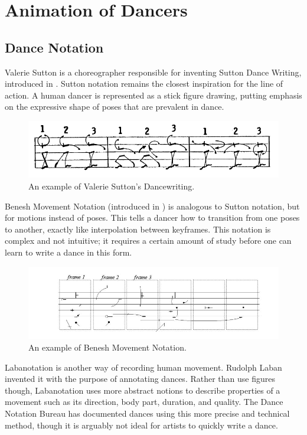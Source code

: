 \section{Animation of Dancers}
\subsection{Dance Notation}
Valerie Sutton is a choreographer responsible for inventing Sutton Dance Writing, introduced in \citep{sutton1979sutton}. Sutton notation remains the closest inspiration for the line of action. A human dancer is represented as a stick figure drawing, putting emphasis on the expressive shape of poses that are prevalent in dance.

\begin{figure}[!h]
\centering
\includegraphics[scale=0.5]{img/sutton}
\caption{An example of Valerie Sutton's Dancewriting.}
\end{figure}

Benesh Movement Notation (introduced in \citep{causley1980introduction}) is analogous to Sutton notation, but for motions instead of poses. This tells a dancer how to transition from one poses to another, exactly like interpolation between keyframes. This notation is complex and not intuitive; it requires a certain amount of study before one can learn to write a dance in this form.

\begin{figure}[!h]
\centering
\includegraphics[scale=0.5]{img/benesh}
\caption{An example of Benesh Movement Notation.}
\end{figure}

Labanotation is another way of recording human movement. Rudolph Laban invented it with the purpose of annotating dances. Rather than use figures though, Labanotation uses more abstract notions to describe properties of a movement such as its direction, body part, duration, and quality. The Dance Notation Bureau has documented dances using this more precise and technical method, though it is arguably not ideal for artists to quickly write a dance.

